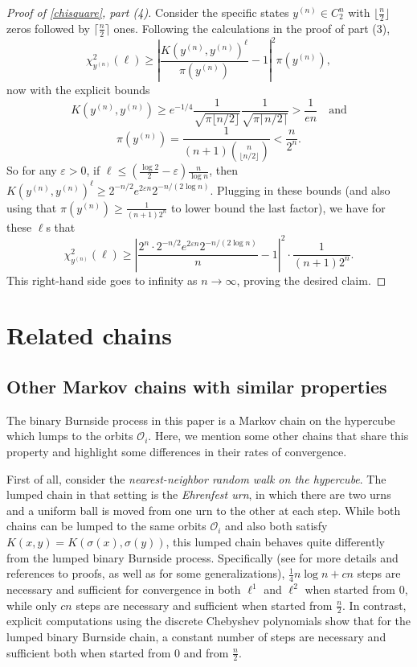\documentclass[11pt]{article}
\newcommand{\mc}{\mathcal}
\newcounter{r}
\newcounter{s}
\numberwithin{equation}{section}
\begin{document}
\begin{proof}[Proof of \cref{chisquare}, part (4)]
Consider the specific states $y^{(n)} \in C_2^n$ with $\lfloor \frac{n}{2} \rfloor$ zeros followed by $\lceil \frac{n}{2} \rceil$ ones. Following the calculations in the proof of part (3), 
\[
    \chi_{y^{(n)}}^2(\ell) \ge \left|\frac{K\left(y^{(n)}, y^{(n)}\right)^\ell}{\pi(y^{(n)})} - 1\right|^2 \pi(y^{(n)}),
\]
now with the explicit bounds 
\[
    K(y^{(n)}, y^{(n)}) \ge e^{-1/4} \frac{1}{\sqrt{\pi \lfloor n/2 \rfloor}} \frac{1}{\sqrt{\pi \lceil n/2 \rceil}} > \frac{1}{en}\quad \text{and}
\]
\[
    \pi(y^{(n)}) = \frac{1}{(n+1) \binom{n}{\lfloor n/2 \rfloor}} < \frac{n}{2^n}.
\]
So for any $\varepsilon > 0$, if $\ell \le \left(\frac{\log 2}{2} - \varepsilon\right) \frac{n}{\log n}$, then $K\left(y^{(n)}, y^{(n)}\right)^\ell \ge 2^{-n/2} e^{2\varepsilon n} 2^{-n/(2 \log n)}$. Plugging in these bounds (and also using that $\pi(y^{(n)}) \ge \frac{1}{(n+1) 2^n}$ to lower bound the last factor), we have for these $\ell$s that
\[
    \chi_{y^{(n)}}^2(\ell) \ge \left|\frac{2^n \cdot 2^{-n/2} e^{2\varepsilon n} 2^{-n/(2 \log n)}}{n}  - 1\right|^2 \cdot \frac{1}{(n+1) 2^n}.
\]
This right-hand side goes to infinity as $n \to \infty$, proving the desired claim.
\end{proof}

\section{Related chains}\label{relatedchainssection}

\subsection{Other Markov chains with similar properties}\label{othermarkovchains}

The binary Burnside process in this paper is a Markov chain on the hypercube which lumps to the orbits $\mc{O}_i$. Here, we mention some other chains that share this property and highlight some differences in their rates of convergence.

First of all, consider the \textit{nearest-neighbor random walk on the hypercube}. The lumped chain in that setting is the \textit{Ehrenfest urn}, in which there are two urns and a uniform ball is moved from one urn to the other at each step. While both chains can be lumped to the same orbits $\mc{O}_i$ and also both satisfy $K(x, y) = K(\sigma(x), \sigma(y))$, this lumped chain behaves quite differently from the lumped binary Burnside process. Specifically (see \cite{cutoff} for more details and references to proofs, as well as \cite{kharezhou} for some generalizations), $\frac{1}{4} n \log n + cn$ steps are necessary and sufficient for convergence in both $\ell^1$ and $\ell^2$ when started from $0$, while only $cn$ steps are necessary and sufficient when started from $\frac{n}{2}$. In contrast, explicit computations using the discrete Chebyshev polynomials show that for the lumped binary Burnside chain, a constant number of steps are necessary and sufficient both when started from $0$ and from $\frac{n}{2}$.
\end{document}
